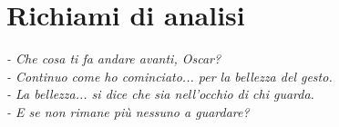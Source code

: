 \chapter{Richiami di analisi}
\vspace{-1.0cm}
\begin{flushright}
\textit{
- Che cosa ti fa andare avanti, Oscar? \\
- Continuo come ho cominciato... per la bellezza del gesto. \\
- La bellezza... si dice che sia nell'occhio di chi guarda. \\
- E se non rimane più nessuno a guardare?
}
\end{flushright}
\vspace{+1.0cm}
\minitoc
\newpage









